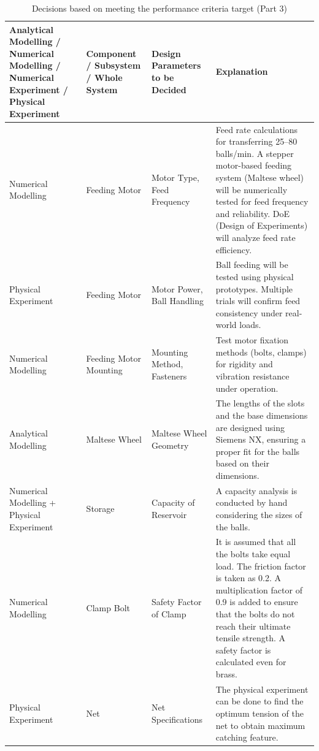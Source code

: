 \documentclass[12pt]{article}
\renewcommand{\arraystretch}{1.2} %
\begin{document}
\begin{table}[H]
\centering
\caption{Decisions based on meeting the performance criteria target (Part 3)}
\scriptsize %
\renewcommand{\arraystretch}{1.5}
\setlength{\tabcolsep}{4pt}
\begin{tabular}{|>{\raggedright\arraybackslash}p{4cm}|>{\raggedright\arraybackslash}p{2cm}|>{\raggedright\arraybackslash}p{3cm}|>{\raggedright\arraybackslash}p{7cm}|}
\hline
\textbf{Analytical Modelling / Numerical Modelling / Numerical Experiment / Physical Experiment} & \textbf{Component / Subsystem / Whole System} & \textbf{Design Parameters to be Decided} & \textbf{Explanation} \\ \hline
Numerical Modelling & Feeding Motor & Motor Type, Feed Frequency & Feed rate calculations for transferring 25–80 balls/min. A stepper motor-based feeding system (Maltese wheel) will be numerically tested for feed frequency and reliability. DoE (Design of Experiments) will analyze feed rate efficiency. \\ \hline
Physical Experiment & Feeding Motor & Motor Power, Ball Handling & Ball feeding will be tested using physical prototypes. Multiple trials will confirm feed consistency under real-world loads. \\ \hline
Numerical Modelling & Feeding Motor Mounting & Mounting Method, Fasteners & Test motor fixation methods (bolts, clamps) for rigidity and vibration resistance under operation. \\ \hline
Analytical Modelling & Maltese Wheel & Maltese Wheel Geometry & The lengths of the slots and the base dimensions are designed using Siemens NX, ensuring a proper fit for the balls based on their dimensions. \\ \hline
Numerical Modelling + Physical Experiment & Storage & Capacity of Reservoir & A capacity analysis is conducted by hand considering the sizes of the balls. \\ \hline
Numerical Modelling & Clamp Bolt & Safety Factor of Clamp & It is assumed that all the bolts take equal load. The friction factor is taken as 0.2. A multiplication factor of 0.9 is added to ensure that the bolts do not reach their ultimate tensile strength. A safety factor is calculated even for brass. \\ \hline
Physical Experiment & Net & Net Specifications & The physical experiment can be done to find the optimum tension of the net to obtain maximum catching feature. \\ \hline
\end{tabular}
\label{tab:performance_criteria}
\end{table}
\end{document}
